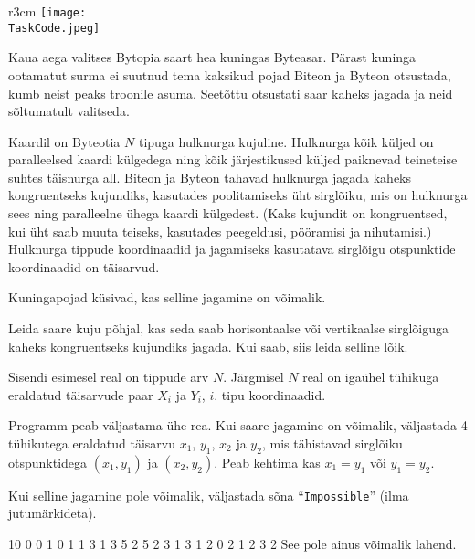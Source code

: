 \documentclass{boi2014-et}
\renewcommand{\TaskCode}{demarcation}
\newcommand{\constant}[1]{{\tt #1}}
\begin{document}
    \begin{wrapfigure}{r}{3cm}
        \vspace{-24pt}
        \texttt{[image: \\TaskCode.jpeg]}
    \end{wrapfigure}

    Kaua aega valitses Bytopia saart hea kuningas Byteasar.
    Pärast kuninga ootamatut surma ei suutnud tema kaksikud pojad
    Biteon ja Byteon otsustada, kumb neist peaks troonile asuma.
    Seetõttu otsustati saar kaheks jagada ja neid sõltumatult valitseda.

    Kaardil on Byteotia $N$ tipuga hulknurga kujuline.
    Hulknurga kõik küljed on paralleelsed kaardi külgedega ning
    kõik järjestikused küljed paiknevad teineteise suhtes täisnurga all.
    Biteon ja Byteon tahavad hulknurga jagada kaheks kongruentseks kujundiks,
    kasutades poolitamiseks üht sirglõiku,
    mis on hulknurga sees ning paralleelne ühega kaardi külgedest.
    (Kaks kujundit on kongruentsed, kui üht saab muuta teiseks,
    kasutades peegeldusi, pööramisi ja nihutamisi.)
    Hulknurga tippude koordinaadid ja jagamiseks
    kasutatava sirglõigu otspunktide koordinaadid on täisarvud.

    Kuningapojad küsivad, kas selline jagamine on võimalik.

    \Task

    Leida saare kuju põhjal, kas seda saab horisontaalse või vertikaalse sirglõiguga
    kaheks kongruentseks kujundiks jagada.
    Kui saab, siis leida selline lõik.

    \Input

    Sisendi esimesel real on tippude arv $N$.
    Järgmisel $N$ real on igaühel tühikuga eraldatud täisarvude paar
    $X_i$ ja $Y_i$, $i$. tipu koordinaadid.

    \Output

    Programm peab väljastama ühe rea.
    Kui saare jagamine on võimalik, väljastada 4 tühikutega eraldatud täisarvu
    $x_1$, $y_1$, $x_2$ ja $y_2$, mis tähistavad sirglõiku otspunktidega
    $(x_1, y_1)$ ja $(x_2, y_2)$.
    Peab kehtima kas $x_1 = y_1$ või $y_1 = y_2$.

    Kui selline jagamine pole võimalik, väljastada sõna
    ``\constant{Impossible}'' (ilma jutumärkideta).

    \Examples

    \example
    {
        10
        0 0
        1 0
        1 1
        3 1
        3 5
        2 5
        2 3
        1 3
        1 2
        0 2
    }
    {
        1 2 3 2
    }
    {
        See pole ainus võimalik lahend.
    }
\end{document}
